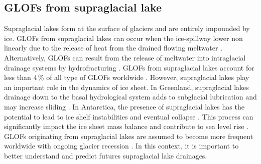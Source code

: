 

\subsection{GLOFs from supraglacial lake}


Supraglacial lakes form at the surface of glaciers and are entirely impounded by ice. GLOFs from supraglacial lakes can occur when the ice-spillway lower non linearly due to the release of heat from the drained flowing meltwater \citep{RaymondNolan2000}. Alternatively, GLOFs can result from the release of meltwater into intraglacial drainage systems by hydrofracturing \citep[e.g.][]{Bjornsson1976, Boon&Sharp2003}. GLOFs from supraglacial lakes account for less than 4\,\% of all type of GLOFs worldwide \citep{Lutzow&al2023}. However, supraglacial lakes play an important role in the dynamics of ice sheet. In Greenland, supraglacial lakes drainage down to the basal hydrological
system adds to subglacial lubrication and may increase sliding \citep[e.g.][]{Schoof2010,Pimentel&Flowers2011,Tedesco&al2013}. In Antarctica, the presence of supraglacial lakes has the potential to lead to ice shelf instabilities and eventual collapse \citep[e.g.][]{Banwell&al2013,Banwell&al2019}. This process can significantly impact the ice sheet mass balance and contribute to sea level rise \citep{Van&al2022}. GLOFs originating from supraglacial lakes are assumed to become more frequent worldwide with ongoing glacier recession \cite{Emmer&al2022,Miles&al2018}. In this context, it is important to better understand and predict futures supraglacial lake drainages. 

